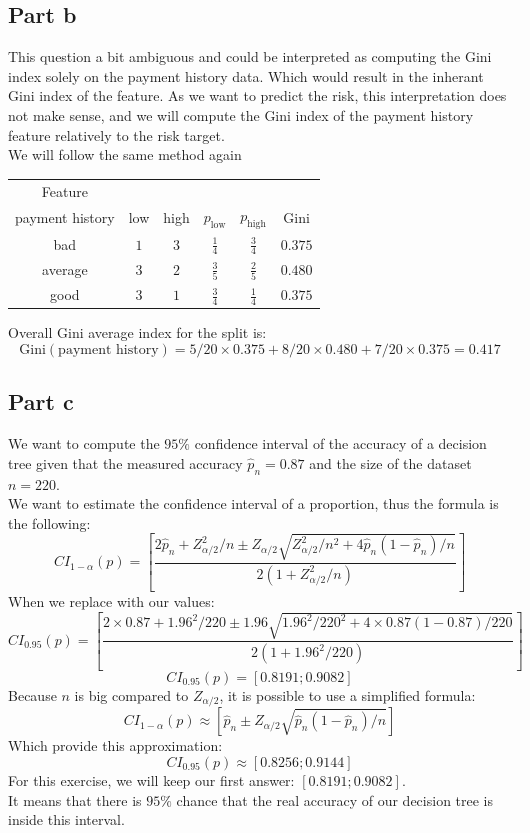 \documentclass[a4paper, 10pt]{article}
\begin{document}
\subsection{Part b}
This question a bit ambiguous and could be interpreted as computing the Gini
index solely on the payment history data. Which would result in the inherant Gini index 
of the feature. As we want to predict the risk, this interpretation does not make sense,
and we will compute the Gini index of the payment history feature relatively to the risk target.
\\
We will follow the same method again
\begin{center}
    \begin{tabular}{ |c|c|c|c|c|c| }
        \hline
        Feature & & & & &\\ payment history & low      & high     & $p_\text{low}$    & $p_\text{high}$ & Gini\\
        \hline
        bad          & $1$      & $3$       & $\frac{1}{4}$     & $\frac{3}{4}$ & $0.375$\\
        \hline
        average      & $3$      & $2$       & $\frac{3}{5}$     & $\frac{2}{5}$ & $0.480$\\
        \hline
        good         & $3$      & $1$       & $\frac{3}{4}$     & $\frac{1}{4}$ & $0.375$\\
        \hline
    \end{tabular}
\end{center}
Overall Gini average index for the split is: 
$$
\text{Gini}(\text{payment history}) = 5/20\times0.375 + 8/20\times0.480 + 7/20\times0.375 = 0.417
$$

\subsection{Part c}
We want to compute the $95\%$ confidence interval of the accuracy of a decision tree
given that the measured accuracy $\hat{p}_n = 0.87$ and the size of the dataset $n=220$.
\\
We want to estimate the confidence interval of a proportion, thus the formula is the following:
$$
CI_{1-\alpha}(p) = \left[\frac{2\hat{p}_n + Z_{\alpha/2}^2/n \pm Z_{\alpha/2}\sqrt{Z_{\alpha/2}^2/n^2 + 4\hat{p}_n(1-\hat{p}_n)/n}}{2(1+Z_{\alpha/2}^2/n)}\right]
$$
When we replace with our values:
$$
CI_{0.95}(p) = \left[\frac{2\times0.87 + 1.96^2/220 \pm 1.96\sqrt{1.96^2/220^2 + 4\times0.87(1-0.87)/220}}{2(1+1.96^2/220)}\right]
$$
$$
CI_{0.95}(p) = \left[0.8191; 0.9082\right]
$$
Because $n$ is big compared to $Z_{\alpha/2}$, it is possible to use a simplified formula:
$$
CI_{1-\alpha}(p)\approx \left[\hat{p}_n \pm Z_{\alpha/2}\sqrt{\hat{p}_n(1-\hat{p}_n)/n}\right]
$$
Which provide this approximation:
$$
CI_{0.95}(p) \approx [0.8256;0.9144]
$$
For this exercise, we will keep our first answer: $\left[0.8191; 0.9082\right]$.
\\
It means that there is $95\%$ chance that the real accuracy of our decision tree is 
inside this interval.
\end{document}
